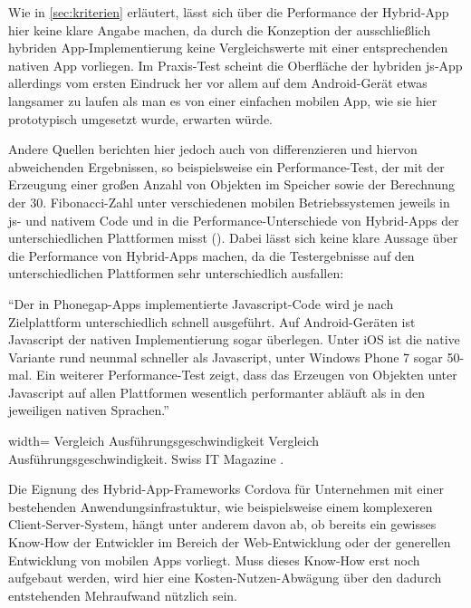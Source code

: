 Wie in \autoref{sec:kriterien} erläutert, lässt sich über die Performance der Hybrid-App hier keine klare Angabe machen, da durch die Konzeption der ausschließlich hybriden App-Implementierung keine Vergleichswerte mit einer entsprechenden nativen App vorliegen.
Im Praxis-Test scheint die Oberfläche der hybriden \gls{js}-App allerdings vom ersten Eindruck her vor allem auf dem Android-Gerät etwas langsamer zu laufen als man es von einer einfachen mobilen App, wie sie hier prototypisch umgesetzt wurde, erwarten würde.

Andere Quellen berichten hier jedoch auch von differenzieren und hiervon abweichenden Ergebnissen, so beispielsweise ein Performance-Test, der mit der Erzeugung einer großen Anzahl von Objekten im Speicher sowie der Berechnung der 30. Fibonacci-Zahl unter verschiedenen mobilen Betriebssystemen jeweils in \gls{js}- und nativem Code und in die Performance-Unterschiede von Hybrid-Apps der unterschiedlichen Plattformen misst ().
Dabei lässt sich keine klare Aussage über die Performance von Hybrid-Apps machen, da die Testergebnisse auf den unterschiedlichen Plattformen sehr unterschiedlich ausfallen:

\begin{quoting}
	\enquote{Der in Phonegap-Apps implementierte Javascript-Code wird je nach Zielplattform unterschiedlich schnell ausgeführt. Auf Android-Geräten ist Javascript der nativen Implementierung sogar überlegen. Unter iOS ist die native Variante rund neunmal schneller als Javascript, unter Windows Phone 7 sogar 50-mal. Ein weiterer Performance-Test zeigt, dass das Erzeugen von Objekten unter Javascript auf allen Plattformen wesentlich performanter abläuft als in den jeweiligen nativen Sprachen.}~\cite{Eine_App_fr_alle_Plattformen_-_IT_Magazine}
\end{quoting}
	
	{width=\fullimagesize}
	{Vergleich Ausführungsgeschwindigkeit}
	{Vergleich Ausführungsgeschwindigkeit.}	%
	{Swiss IT Magazine \cite{PerformanceTabelle}.}



Die Eignung des Hybrid-App-Frameworks Cordova für Unternehmen mit einer bestehenden Anwendungsinfrastuktur, wie beispielsweise einem komplexeren Client-Server-System, hängt unter anderem davon ab, ob bereits ein gewisses Know-How der Entwickler im Bereich der Web-Entwicklung oder der generellen Entwicklung von mobilen Apps vorliegt. 
Muss dieses Know-How erst noch aufgebaut werden, wird hier eine Kosten-Nutzen-Abwägung über den dadurch entstehenden Mehraufwand nützlich sein.

